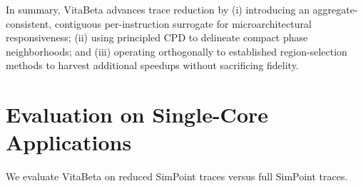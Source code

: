 In summary, VitaBeta advances trace reduction by (i) introducing an aggregate-consistent, contiguous per-instruction surrogate for microarchitectural responsiveness; (ii) using principled CPD to delineate compact phase neighborhoods; and (iii) operating orthogonally to established region-selection methods to harvest additional speedups without sacrificing fidelity.
 
\section{Evaluation on Single-Core Applications} 
\label{evaluation_sc}
We evaluate VitaBeta on reduced SimPoint traces versus full SimPoint traces.
